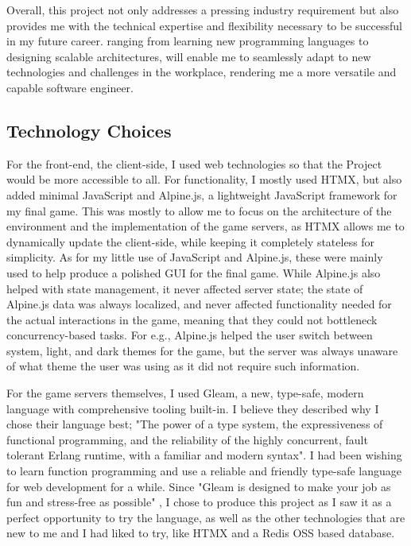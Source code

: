 \documentclass[]{final}
\begin{document}
Overall, this project not only addresses a pressing industry requirement but also provides
me with the technical expertise and flexibility necessary to be successful in my future career.
ranging from learning new programming languages to designing scalable architectures, will enable me to
seamlessly adapt to new technologies and challenges in the workplace, rendering me a more
versatile and capable software engineer.

\newpage

\subsection{Technology Choices}

\label{alpine}

For the front-end, the client-side, I used web technologies so that the Project
would be more accessible to all. For functionality, I mostly used HTMX,
but also added minimal JavaScript and Alpine.js, a lightweight JavaScript
framework\cite{noauthor_alpine.js_nodate} for my final game.
This was mostly to allow me to focus on the
architecture of the environment and the implementation of the game
servers, as HTMX allows me to dynamically update the client-side, while
keeping it completely stateless for simplicity. As for my little use of
JavaScript and Alpine.js, these were mainly used to help produce a polished
GUI for the final game. While Alpine.js also helped with state management,
it never affected server state; the state of Alpine.js data was always
localized, and never affected functionality needed for the actual interactions
in the game, meaning that they could not bottleneck concurrency-based tasks.
For e.g., Alpine.js helped the user switch between system, light, and dark
themes for the game, but the server was always unaware of what theme the user
was using as it did not require such information.

\label{REDISOSS}

For the game servers themselves, I used Gleam, a new, type-safe, modern
language with comprehensive tooling built-in. I believe they described why I
chose their language best; "The power of a type system, the expressiveness
of functional programming, and the reliability of the highly concurrent,
fault tolerant Erlang runtime, with a familiar and modern syntax"\cite{noauthor_gleam_nodate}.
I had been wishing to learn function programming and use a reliable and friendly
type-safe language for web development for a while.
Since "Gleam is designed to make your job as fun and stress-free as possible" \cite{noauthor_gleam_nodate},
I chose to produce this project as I saw it as a perfect opportunity to try the
language, as well as the other technologies that are new to me and I had liked
to try, like HTMX and a Redis OSS based database.
\end{document}
